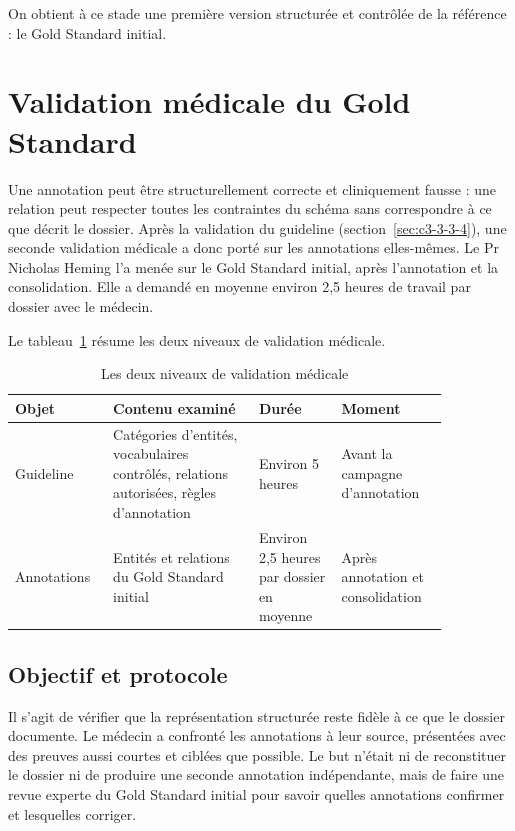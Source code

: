 On obtient à ce stade une première version structurée et contrôlée de la référence : le Gold Standard initial.

\section{Validation médicale du Gold Standard}\label{sec:c3-3-9}

Une annotation peut être structurellement correcte et cliniquement fausse : une relation peut respecter toutes les contraintes du schéma sans correspondre à ce que décrit le dossier. Après la validation du guideline (section~\ref{sec:c3-3-3-4}), une seconde validation médicale a donc porté sur les annotations elles-mêmes. Le Pr Nicholas Heming l’a menée sur le Gold Standard initial, après l’annotation et la consolidation. Elle a demandé en moyenne environ 2,5 heures de travail par dossier avec le médecin.

Le tableau~\ref{tab:c3-3-val} résume les deux niveaux de validation médicale.

\begin{table}[H]
\centering
\caption{Les deux niveaux de validation médicale}\label{tab:c3-3-val}
\small
\begin{tabular}{>{\raggedright\arraybackslash}p{0.17\linewidth}>{\raggedright\arraybackslash}p{0.30\linewidth}>{\raggedright\arraybackslash}p{0.17\linewidth}>{\raggedright\arraybackslash}p{0.22\linewidth}}
\toprule
\textbf{Objet} & \textbf{Contenu examiné} & \textbf{Durée} & \textbf{Moment} \\
\midrule
Guideline & Catégories d’entités, vocabulaires contrôlés, relations autorisées, règles d’annotation & Environ 5 heures & Avant la campagne d’annotation \\
Annotations & Entités et relations du Gold Standard initial & Environ 2,5 heures par dossier en moyenne & Après annotation et consolidation \\
\bottomrule
\end{tabular}
\end{table}

\subsection{Objectif et protocole}\label{sec:c3-3-9-1}

Il s’agit de vérifier que la représentation structurée reste fidèle à ce que le dossier documente. Le médecin a confronté les annotations à leur source, présentées avec des preuves aussi courtes et ciblées que possible. Le but n’était ni de reconstituer le dossier ni de produire une seconde annotation indépendante, mais de faire une revue experte du Gold Standard initial pour savoir quelles annotations confirmer et lesquelles corriger.

